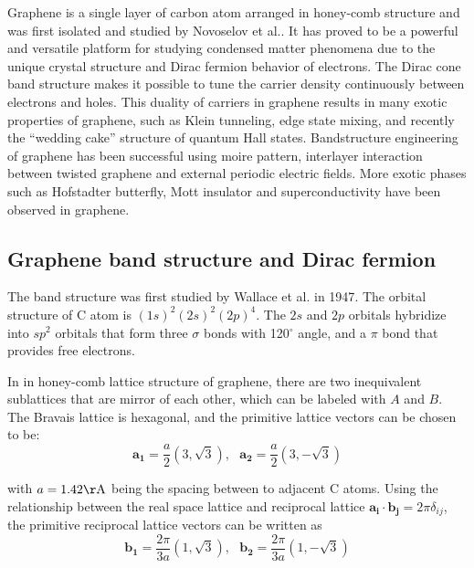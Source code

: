 \documentclass[pdflatex, sectionletters, 12pt]{pittetd}    %
\begin{document}
Graphene is a single layer of carbon atom arranged in honey-comb structure and was first isolated and studied by Novoselov et al.\cite{novoselov2004electric}. It has proved to be a powerful and versatile platform for studying condensed matter phenomena due to the unique crystal structure and Dirac fermion behavior of electrons\cite{wilson2006electrons}. The Dirac cone band structure makes it possible to tune the carrier density continuously between electrons and holes. This duality of carriers in graphene results in many exotic properties of graphene, such as Klein tunneling\cite{allain2011klein, katsnelson2006chiral, young2009quantum, shytov2008klein}, edge state mixing\cite{williams2007quantum, abanin2007quantized, lohmann2009four, amet2014selective}, and recently the ``wedding cake'' structure of quantum Hall states\cite{gutierrez2018interaction}. Bandstructure engineering of graphene has been successful using moire pattern\cite{dean2013hofstadter, hunt2013massive}, interlayer interaction between twisted graphene\cite{cao2018correlated, cao2018unconventional} and external periodic electric fields\cite{forsythe2018band}. More exotic phases such as Hofstadter butterfly\cite{dean2013hofstadter, hunt2013massive, forsythe2018band}, Mott insulator\cite{cao2018correlated} and superconductivity\cite{cao2018unconventional} have been observed in graphene.

\subsection{Graphene band structure and Dirac fermion}

The band structure was first studied by Wallace et al. in 1947\cite{wallace1947band}. The orbital structure of C atom is $(1s)^2(2s)^2(2p)^4$. The $2s$ and $2p$ orbitals hybridize into $sp^2$ orbitals that form three $\sigma$ bonds with 120$^{\circ}$ angle, and a $\pi$ bond that provides free electrons. 

In in honey-comb lattice structure of graphene, there are two inequivalent sublattices that are mirror of each other, which can be labeled with $A$ and $B$. The Bravais lattice is hexagonal, and the primitive lattice vectors can be chosen to be: 
$$\mathbf{a_1} = \frac{a}{2}\left(3, \sqrt{3}\right), \ \ \ \mathbf{a_2} = \frac{a}{2}\left(3, -\sqrt{3}\right)$$

with $a = 1.42\mathrm{\AA}$ being the spacing between to adjacent C atoms. Using the relationship between the real space lattice and reciprocal lattice $\mathbf{a_i}\cdot\mathbf{b_j} = 2\pi\delta_{ij}$, the primitive reciprocal lattice vectors can be written as 
$$\mathbf{b_1} = \frac{2\pi}{3a}\left(1, \sqrt{3}\right), \ \ \ \mathbf{b_2} = \frac{2\pi}{3a}\left(1, -\sqrt{3}\right)$$
\end{document}
